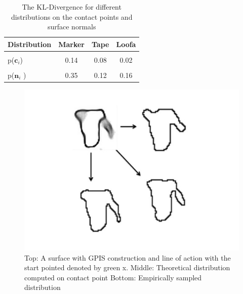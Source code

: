 \documentclass[letterpaper, 10 pt, conference]{ieeeconf}  %
\begin{document}
\begin{table}[ht!]
        \begin{tabular}{ l | c c c}
         Distribution & \bf Marker & \bf Tape & \bf Loofa \\ 
        \hline \\
         p($\textbf{c}_i$) & 0.14 & 0.08 & 0.02 \\
        \hline \\
        p($\textbf{n}_i$ )& 0.35 & 0.12 & 0.16 \\
        \hline 
        \end{tabular}
        \caption{The KL-Divergence for different distributions on the contact points and surface normals}
		
\vspace*{-20pt}
\end{table}


\begin{figure}[ht!]
\centering
\includegraphics[scale = 0.3]{figures/Slide07.jpg}
\caption{Top: A surface with GPIS construction and line of action with the start pointed denoted by green x.
Middle: Theoretical distribution computed on contact point
Bottom: Empirically sampled distribution}
\vspace*{-10pt}
\label{fig:Contact_Dist}
\end{figure}
\end{document}
